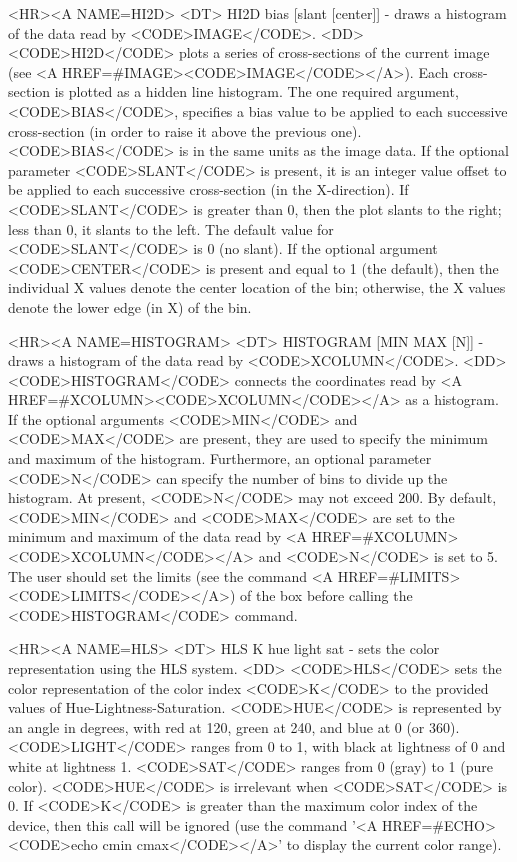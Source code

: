 \begin{rawhtml}
<HR><A NAME=HI2D>
<DT>
HI2D bias [slant [center]] - draws a histogram of the data read by <CODE>IMAGE</CODE>.
<DD>
	<CODE>HI2D</CODE> plots a series of cross-sections of the current
	image (see <A HREF=#IMAGE><CODE>IMAGE</CODE></A>).  Each
	cross-section is plotted as a hidden line histogram.  The one
	required argument, <CODE>BIAS</CODE>, specifies a bias value
	to be applied to each successive cross-section (in order to
	raise it above the previous one).  <CODE>BIAS</CODE> is in the
	same units as the image data.  If the optional parameter
	<CODE>SLANT</CODE> is present, it is an integer value offset to
	be applied to each successive cross-section (in the X-direction).
	If <CODE>SLANT</CODE> is greater than 0, then the plot slants to
	the right; less than 0, it slants to the left.  The default value
	for <CODE>SLANT</CODE> is 0 (no slant).  If the optional argument
	<CODE>CENTER</CODE> is present and equal to 1 (the default), then
	the individual X values denote the center location of the bin;
	otherwise, the X values denote the lower edge (in X) of the bin.

<HR><A NAME=HISTOGRAM>
<DT>
HISTOGRAM [MIN MAX [N]] - draws a histogram of the data read by <CODE>XCOLUMN</CODE>.
<DD>
	<CODE>HISTOGRAM</CODE> connects the coordinates read by
	<A HREF=#XCOLUMN><CODE>XCOLUMN</CODE></A> as a histogram.  If the
	optional arguments <CODE>MIN</CODE> and <CODE>MAX</CODE> are present,
	they are used to specify the minimum and maximum of the histogram.
	Furthermore, an optional parameter <CODE>N</CODE> can specify the
	number of bins to divide up the histogram.  At present, <CODE>N</CODE>
	may not exceed 200.  By default, <CODE>MIN</CODE> and <CODE>MAX</CODE>
	are set to the minimum and maximum of the data read by
	<A HREF=#XCOLUMN><CODE>XCOLUMN</CODE></A> and <CODE>N</CODE> is set
	to 5.  The user should set the limits (see the command
	<A HREF=#LIMITS><CODE>LIMITS</CODE></A>) of the box before calling
	the <CODE>HISTOGRAM</CODE> command.

<HR><A NAME=HLS>
<DT>
HLS K hue light sat - sets the color representation using the HLS system.
<DD>
	<CODE>HLS</CODE> sets the color representation of the color index
	<CODE>K</CODE> to the provided values of Hue-Lightness-Saturation.
	<CODE>HUE</CODE> is represented by an angle in degrees, with red
	at 120, green at 240, and blue at 0 (or 360).  <CODE>LIGHT</CODE>
	ranges from 0 to 1, with black at lightness of 0 and white at
	lightness 1.  <CODE>SAT</CODE> ranges from 0 (gray) to 1 (pure color).
	<CODE>HUE</CODE> is irrelevant when <CODE>SAT</CODE> is 0.  If
	<CODE>K</CODE> is greater than the maximum color index of the device,
	then this call will be ignored (use the command
	'<A HREF=#ECHO><CODE>echo cmin cmax</CODE></A>'
	to display the current color range).


\end{rawhtml}
